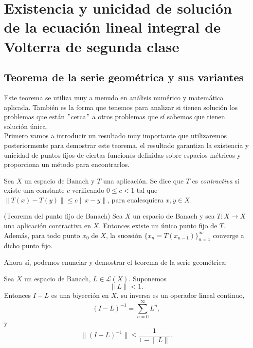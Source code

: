 \chapter{Existencia y unicidad de solución de la ecuación lineal integral de Volterra de segunda clase}
\section{Teorema de la serie geométrica y sus variantes}
Este teorema se utiliza muy a menudo en análisis numérico y matemática aplicada. También es la forma que tenemos para analizar si tienen solución los problemas que están $"$cerca$"$ a otros problemas que sí sabemos que tienen solución única.\\

Primero vamos a introducir un resultado muy importante que utilizaremos posteriormente para demostrar este teorema, el resultado garantiza la existencia y unicidad de puntos fijos de ciertas funciones definidas sobre espacios métricos y proporciona un método para encontrarlos.
\begin{definicion}
	Sea $X$ un espacio de Banach y $T$ una aplicación. Se dice que $T$ es \textit{contractiva} si existe una constante $c$ verificando $0 \leqslant c < 1$ tal que $\lVert T(x) - T(y) \rVert \leqslant c \lVert x-y \rVert$, para cualesquiera $x, y \in X$.
\end{definicion}
\begin{teorema}
	(Teorema del punto fijo de Banach) Sea $X$ un espacio de Banach y sea $T:X \rightarrow X$ una aplicación contractiva en $X$. Entonces existe un único punto fijo de $T$.\\
	Además, para todo punto $x_0$ de $X$, la sucesión $\{x_n=T(x_{n-1})\}_{n=1}^\infty$ converge a dicho punto fijo.
\end{teorema}
Ahora sí, podemos enunciar y demostrar el teorema de la serie geométrica:
\begin{teorema}
	Sea $X$ un espacio de Banach, $L \in \mathcal{L}(X)$. Suponemos
	\begin{equation}
		\lVert L \rVert < 1.
	\end{equation}
	Entonces $I - L$ es una biyección en $X$, su inversa es un operador lineal continuo,
	\begin{equation}
		(I-L)^{-1} = \sum_{n=0}^{\infty}L^n,
	\end{equation}
	y
	\begin{equation}\label{eq:teo1}
		\lVert (I-L)^{-1} \rVert \leqslant \dfrac{1}{1 - \lVert L \rVert}.
	\end{equation}
\end{teorema}
